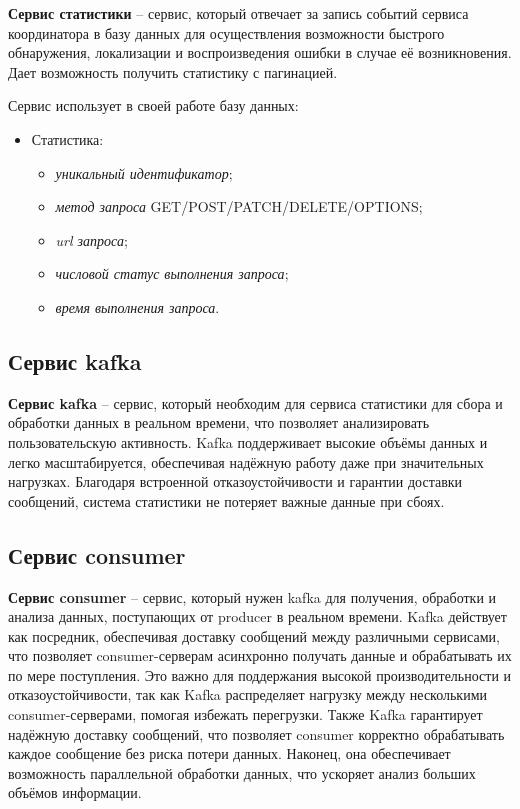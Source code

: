 \textbf{Сервис статистики} -- сервис, который отвечает за запись событий сервиса координатора в базу данных для осуществления возможности быстрого обнаружения, локализации и воспроизведения ошибки в случае её возникновения. Дает возможность получить статистику с пагинацией.

Сервис использует в своей работе базу данных:
\begin{itemize}
  \item Статистика:
  \begin{itemize}
    \item \textit{уникальный идентификатор};
    \item \textit{метод запроса} GET/POST/PATCH/DELETE/OPTIONS;
    \item \textit{url запроса};
    \item \textit{числовой статус выполнения запроса};
    \item \textit{время выполнения запроса}.
  \end{itemize}
\end{itemize}


\subsection{Сервис kafka}

\textbf{Сервис kafka} \cite{kafka} -- сервис, который необходим для сервиса статистики для сбора и обработки данных в реальном времени, что позволяет анализировать пользовательскую активность. Kafka поддерживает высокие объёмы данных и легко масштабируется, обеспечивая надёжную работу даже при значительных нагрузках. Благодаря встроенной отказоустойчивости и гарантии доставки сообщений, система статистики не потеряет важные данные при сбоях.


\subsection{Сервис consumer}

\textbf{Сервис consumer} -- сервис, который нужен kafka для получения, обработки и анализа данных, поступающих от producer в реальном времени. Kafka действует как посредник, обеспечивая доставку сообщений между различными сервисами, что позволяет consumer-серверам асинхронно получать данные и обрабатывать их по мере поступления. Это важно для поддержания высокой производительности и отказоустойчивости, так как Kafka распределяет нагрузку между несколькими consumer-серверами, помогая избежать перегрузки. Также Kafka гарантирует надёжную доставку сообщений, что позволяет consumer корректно обрабатывать каждое сообщение без риска потери данных. Наконец, она обеспечивает возможность параллельной обработки данных, что ускоряет анализ больших объёмов информации.



